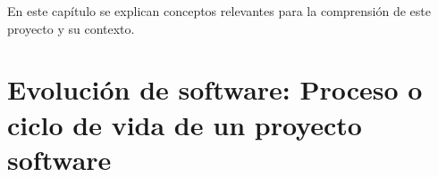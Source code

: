 \begin{comment}
%
%
%
%
%
\end{comment}

En este capítulo se explican conceptos relevantes para la comprensión de este proyecto y su contexto.

\section{Evolución de software: Proceso o ciclo de vida de un proyecto software}



